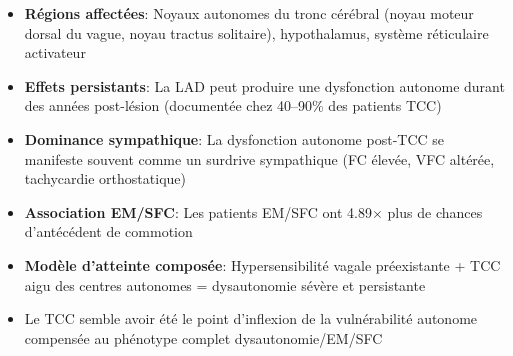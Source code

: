 \begin{description}
\begin{itemize}
\begin{itemize}
\begin{itemize}
                \item \textbf{Régions affectées}: Noyaux autonomes du tronc cérébral (noyau moteur dorsal du vague, noyau tractus solitaire), hypothalamus, système réticulaire activateur
                \item \textbf{Effets persistants}: La LAD peut produire une dysfonction autonome durant des années post-lésion (documentée chez 40--90\% des patients TCC)
                \item \textbf{Dominance sympathique}: La dysfonction autonome post-TCC se manifeste souvent comme un surdrive sympathique (FC élevée, VFC altérée, tachycardie orthostatique)
                \item \textbf{Association EM/SFC}: Les patients EM/SFC ont 4.89$\times$ plus de chances d'antécédent de commotion
                \item \textbf{Modèle d'atteinte composée}: Hypersensibilité vagale préexistante + TCC aigu des centres autonomes = dysautonomie sévère et persistante
                \item Le TCC semble avoir été le point d'inflexion de la vulnérabilité autonome compensée au phénotype complet dysautonomie/EM/SFC
            \end{itemize}


\end{itemize}
\end{itemize}
\end{description}
